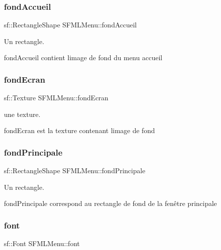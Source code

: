 \subsubsection{\texorpdfstring{fond\+Accueil}{fondAccueil}}
{\footnotesize\ttfamily sf\+::\+Rectangle\+Shape S\+F\+M\+L\+Menu\+::fond\+Accueil\hspace{0.3cm}{\ttfamily [private]}}



Un rectangle. 

fond\+Accueil contient l\textquotesingle{}image de fond du menu accueil \mbox{\label{class_s_f_m_l_menu_a44a555c22f2436a44382767da74d91b5}} 
\subsubsection{\texorpdfstring{fond\+Ecran}{fondEcran}}
{\footnotesize\ttfamily sf\+::\+Texture S\+F\+M\+L\+Menu\+::fond\+Ecran\hspace{0.3cm}{\ttfamily [private]}}



une texture. 

fond\+Ecran est la texture contenant l\textquotesingle{}image de fond \mbox{\label{class_s_f_m_l_menu_a233057a68d8e183daff723e7ccd33077}} 
\subsubsection{\texorpdfstring{fond\+Principale}{fondPrincipale}}
{\footnotesize\ttfamily sf\+::\+Rectangle\+Shape S\+F\+M\+L\+Menu\+::fond\+Principale\hspace{0.3cm}{\ttfamily [private]}}



Un rectangle. 

fond\+Principale correspond au rectangle de fond de la fenêtre principale \mbox{\label{class_s_f_m_l_menu_a4edf61746282316a52f401f8655b0eae}} 
\subsubsection{\texorpdfstring{font}{font}}
{\footnotesize\ttfamily sf\+::\+Font S\+F\+M\+L\+Menu\+::font\hspace{0.3cm}{\ttfamily [private]}}



